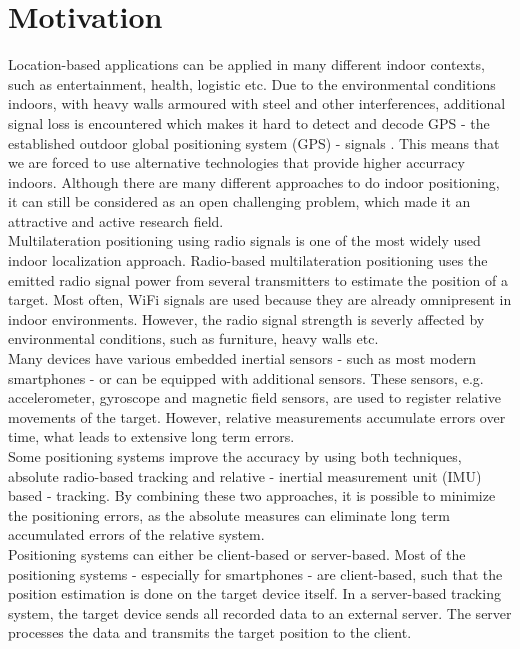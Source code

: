 \section{Motivation}
Location-based applications can be applied in many different indoor contexts, such as entertainment, health, logistic etc. Due to the environmental conditions indoors, with heavy walls armoured with steel and other interferences, additional signal loss is encountered which makes it hard to detect and decode GPS - the established outdoor global positioning system (GPS) - signals \cite{GPSforIndoor}. This means that we are forced to use alternative technologies that provide higher accurracy indoors. Although there are many different approaches to do indoor positioning, it can still be considered as an open challenging problem, which made it an attractive and active research field.\\
\noindent\hspace*{5mm}%
Multilateration positioning using radio signals is one of the most widely used indoor localization approach. Radio-based multilateration positioning uses the emitted radio signal power from several transmitters to estimate the position of a target. Most often, WiFi signals are used because they are already omnipresent in indoor environments. However, the radio signal strength is severly affected by environmental conditions, such as furniture, heavy walls etc.\\
\noindent\hspace*{5mm}%
Many devices have various embedded inertial sensors - such as most modern smartphones - or can be equipped with additional sensors. These sensors, e.g. accelerometer, gyroscope and magnetic field sensors, are used to register relative movements of the target. However, relative measurements accumulate errors over time, what leads to extensive long term errors.\\
\noindent\hspace*{5mm}%
Some positioning systems improve the accuracy by using both techniques, absolute radio-based tracking and relative - inertial measurement unit (IMU) based - tracking. By combining these two approaches, it is possible to minimize the positioning errors, as the absolute measures can eliminate long term accumulated errors of the relative system. \\
\noindent\hspace*{5mm}%
Positioning systems can either be client-based or server-based. Most of the positioning systems - especially for smartphones - are client-based, such that the position estimation is done on the target device itself. In a server-based tracking system, the target device sends all recorded data to an external server. The server processes the data and transmits the target position to the client. \\
